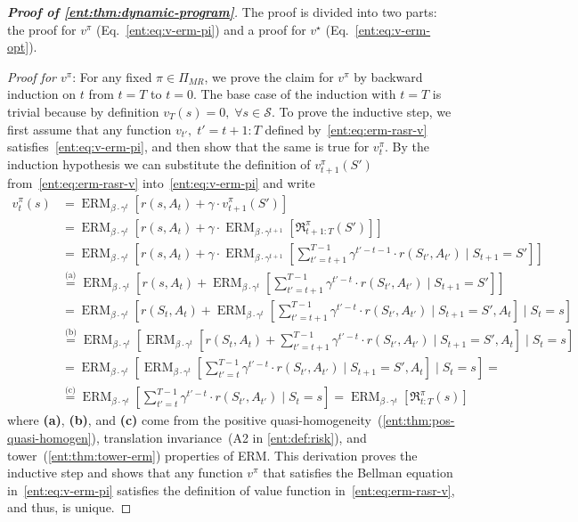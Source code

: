 \documentclass[twoside]{article}
\newcommand{\states}{\mathcal{S}}
\newcommand{\opt}{^\star}
\newcommand{\erm}[2]{\operatorname{ERM}_{#1}\left[#2\right]}
\theoremstyle{plain}
\theoremstyle{definition}
\theoremstyle{remark}
\begin{document}
\begin{proof}[\bf\em Proof of \cref{ent:thm:dynamic-program}]
The proof is divided into two parts: the proof for $v^{\pi}$ (Eq.~\ref{ent:eq:v-erm-pi}) and a proof for $v\opt$ (Eq.~\ref{ent:eq:v-erm-opt}).

{\em Proof for $v^\pi$}: For any fixed $\pi\in \Pi_{MR}$, we prove the claim for $v^{\pi}$ by backward induction on $t$ from $t=T$ to $t=0$. %
The base case of the induction with $t = T$ is trivial because by definition $v_T(s) = 0,\;\forall s\in \states$. To prove the inductive step, we first assume that any function $v_{t'},\;t'=t+1{:}T$ defined by~\eqref{ent:eq:erm-rasr-v} satisfies~\eqref{ent:eq:v-erm-pi}, and then show that the same is true for $v^\pi_t$. By the induction hypothesis we can substitute the definition of $v_{t+1}^{\pi}(S')$ from~\eqref{ent:eq:erm-rasr-v} into~\eqref{ent:eq:v-erm-pi} and write 
%
\begin{align*}
v_t^{\pi}(s) &= \erm{\beta \cdot \gamma^t} {r(s,A_t) + \gamma\cdot v_{t+1}^{\pi}(S')} \nonumber \\
&= \erm{\beta\cdot \gamma^t} {r(s,A_t) + \gamma \cdot \erm{\beta \cdot \gamma^{t+1}} {\mathfrak{R}^\pi_{t+1{:}T}(S')}} \nonumber \\
&= \erm{\beta\cdot \gamma^t} {r(s,A_t) + \gamma \cdot \erm{\beta \cdot \gamma^{t+1}} {\sum_{t'=t+1}^{T-1} \gamma^{t'-t-1} \cdot r(S_{t'},A_{t'})  \mid S_{t+1} = S' } } \nonumber \\
&\stackrel{\text{(a)}}{=} \erm{\beta\cdot \gamma^t} {r(s,A_t) + \erm{\beta \cdot \gamma^{t}} {\sum_{t'=t+1}^{T-1} \gamma^{t'-t} \cdot r(S_{t'},A_{t'})  \mid S_{t+1} = S' }} \nonumber \\
&= \erm{\beta\cdot \gamma^t} {r(S_t,A_t) + \erm{\beta \cdot \gamma^{t}} {\sum_{t'=t+1}^{T-1} \gamma^{t'-t} \cdot r(S_{t'},A_{t'})  \mid S_{t+1} = S', A_t }  \mid S_t = s} \nonumber \\
&\stackrel{\text{(b)}}{=} \erm{\beta\cdot \gamma^t} { \erm{\beta \cdot \gamma^{t}} {r(S_t,A_t) +\sum_{t'=t+1}^{T-1} \gamma^{t'-t} \cdot r(S_{t'},A_{t'})  \mid S_{t+1} = S', A_t }  \mid S_t = s} \nonumber \\
&= \erm{\beta\cdot \gamma^t} { \erm{\beta \cdot \gamma^{t}} { \sum_{t'=t}^{T-1} \gamma^{t'-t} \cdot r(S_{t'},A_{t'})  \mid S_{t+1} = S', A_t }  \mid S_t = s} = \nonumber \\
&\stackrel{\text{(c)}}{=} \erm{\beta \cdot \gamma^{t}} { \sum_{t'=t}^{T-1} \gamma^{t'-t} \cdot r(S_{t'},A_{t'}) \mid S_t = s} = \erm{\beta \cdot \gamma^{t}} {\mathfrak{R}^\pi_{t{:}T}(s)}
\end{align*}
%
where {\bf (a)}, {\bf (b)}, and {\bf (c)} come from the positive quasi-homogeneity~(\cref{ent:thm:pos-quasi-homogen}), translation invariance~(A2 in \cref{ent:def:risk}), and tower~(\cref{ent:thm:tower-erm}) properties of ERM. This derivation proves the inductive step and shows that any function $v^{\pi}$ that satisfies the Bellman equation in~\eqref{ent:eq:v-erm-pi} satisfies the definition of value function in~\eqref{ent:eq:erm-rasr-v}, and thus, is unique. 


\end{proof}
\end{document}
